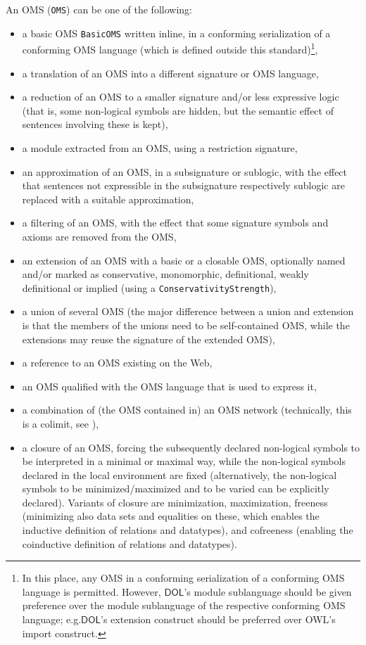 \documentclass[10pt,fleqn,final]{scrreprt}
\makeatletter
\newcommand{\cbs}[0]{\color{red}\xspace} %
\newcommand{\cbe}[0]{\color{black}\xspace} %
\newcommand*{\eg}{e.g.\@\xspace}
\newcommand*{\syntax}[1]{\texttt{#1}}
\newcommand*{\DOL}{\ensuremath{\mathsf{DOL}}\xspace}
\newenvironment{definitions}[0]{\medskip }{}
\makeatother
\begin{document}
\begin{definitions}
An OMS (\syntax{OMS}) can be one of the following:
\begin{itemize}
\item a basic OMS \syntax{BasicOMS} written inline, in a conforming serialization of a conforming OMS 
language (which is defined outside this standard)\footnote{In this place, any OMS in a conforming serialization of a conforming OMS language is permitted.  
However, \DOL's module sublanguage should be given preference over the module sublanguage of 
the respective conforming OMS language; \eg \DOL's extension construct should be preferred over OWL's import construct.},
\item a translation of an OMS into a different signature or OMS
language,
\item a reduction of an OMS to a smaller signature and/or less
expressive logic (that is,
some non-logical symbols are hidden, but the semantic effect of sentences involving these is kept),
\item a module extracted from an OMS, using a restriction signature,
\item an approximation of an OMS, in a subsignature or sublogic, with the effect that sentences not expressible in the subsignature respectively sublogic are replaced with a suitable approximation,
\item a filtering of an OMS, with the effect that some signature symbols and axioms are removed from the OMS,
\item an extension of an OMS with a basic or a closable OMS, optionally named and/or marked as conservative, monomorphic, definitional, weakly definitional or implied (using a \syntax{ConservativityStrength}),
\item a union of several OMS (the major difference between a union and extension is that the members of the unions need to be self-contained OMS, while the extensions may reuse the signature of the extended OMS), 
\item a reference to an OMS existing on the Web,
\item an OMS qualified with the OMS language that is used to express it,
\item a combination of (the OMS contained in) an OMS network (technically, this is a colimit, see \cite{ZimmermanEtAl06}),
\item a \cbs closure\cbe of an OMS, forcing the subsequently declared
  non-logical symbols to be interpreted in a minimal \cbs or maximal\cbe{} way, while the non-logical symbols declared \cbs in the local environment\cbe{} are fixed (alternatively, the non-logical symbols to be \cbs minimized/maximized\cbe{} and to be varied can be explicitly declared). Variants of\cbs closure are minimization,\cbe{}
maximization, freeness (minimizing also data sets and equalities on these, \cbs which enables the inductive definition of relations and datatypes), and cofreeness
(enabling the coinductive definition of relations and datatypes).\cbe
\end{itemize}


\end{definitions}
\end{document}
